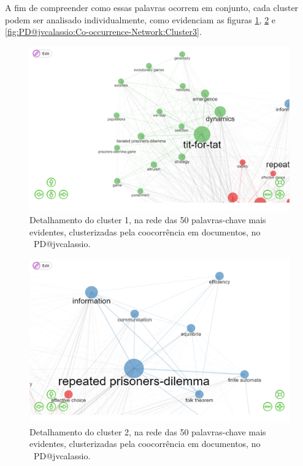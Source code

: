 A fim de compreender como essas palavras ocorrem em conjunto, cada cluster podem ser analisado individualmente, como evidenciam as figuras \ref{fig:PD@jvcalassio:Co-occurrence-Network:Cluster1}, \ref{fig:PD@jvcalassio:Co-occurrence-Network:Cluster2} e \ref{fig:PD@jvcalassio:Co-occurrence-Network:Cluster3}.

\begin{figure}
    \centering
    \includegraphics[width=1\textwidth]{exploratory-data-analysis/jvcalassio/PesqBibliogr/PrisonersDilemma/WoS-20221201/Dataset/Cluster1-Co-occurrence-Network-2022-12-03.png}
    \caption{Detalhamento do cluster 1, na rede das 50 palavras-chave mais evidentes, clusterizadas pela coocorrência em documentos, no  \dataset\ PD@jvcalassio.}
    \label{fig:PD@jvcalassio:Co-occurrence-Network:Cluster1}
\end{figure}

\begin{figure}
    \centering
    \includegraphics[width=1\textwidth]{exploratory-data-analysis/jvcalassio/PesqBibliogr/PrisonersDilemma/WoS-20221201/Dataset/Cluster2-Co-occurrence-Network-2022-12-03.png}
    \caption{Detalhamento do cluster 2, na rede das 50 palavras-chave mais evidentes, clusterizadas pela coocorrência em documentos, no  \dataset\ PD@jvcalassio.}
    \label{fig:PD@jvcalassio:Co-occurrence-Network:Cluster2}
\end{figure}

